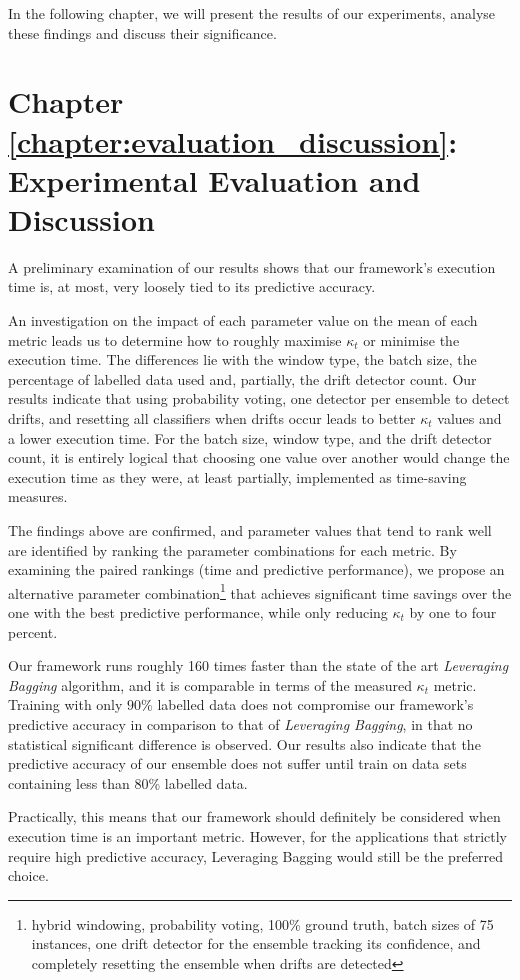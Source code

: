 In the following chapter, we will present the results of our experiments, analyse these findings and discuss their significance.

\section{Chapter \ref{chapter:evaluation_discussion}: Experimental Evaluation and Discussion}
A preliminary examination of our results shows that our framework's execution time is, at most, very loosely tied to its predictive accuracy.

An investigation on the impact of each parameter value on the mean of each metric leads us to determine how to roughly maximise $\kappa_t$ or minimise the execution time.
The differences lie with the window type, the batch size, the percentage of labelled data used and, partially, the drift detector count. Our results indicate that using probability voting, one detector per ensemble to detect drifts, and resetting all classifiers when drifts occur leads to better $\kappa_t$ values and a lower execution time. For the batch size, window type, and the drift detector count, it is entirely logical that choosing one value over another would change the execution time as they were, at least partially, implemented as time-saving measures.

The findings above are confirmed, and parameter values that tend to rank well are identified by ranking the parameter combinations for each metric. By examining the paired rankings (time and predictive performance), we propose an alternative parameter combination\footnote{hybrid windowing, probability voting, 100\% ground truth, batch sizes of 75 instances, one drift detector for the ensemble tracking its confidence, and completely resetting the ensemble when drifts are detected} that achieves significant time savings over the one with the best predictive performance, while only reducing $\kappa_t$ by one to four percent.

Our framework runs roughly 160 times faster than the state of the art \textit{Leveraging Bagging} algorithm, and it is comparable in terms of the measured $\kappa_t$ metric. Training with only $90\%$ labelled data does not compromise our framework's predictive accuracy in comparison to that of \textit{Leveraging Bagging}, in that no statistical significant difference is observed. Our results also indicate that the predictive accuracy of our ensemble does not suffer until train on data sets containing less than 80\% labelled data.

Practically, this means that our framework should definitely be considered when execution time is an important metric. However, for the applications that strictly require high predictive accuracy, Leveraging Bagging would still be the preferred choice.

